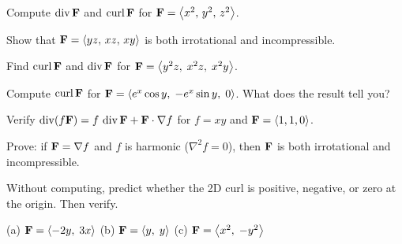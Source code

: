\documentclass[11pt]{article}
\begin{document}
\begin{practice}

\prob
Compute $\operatorname{div}\mathbf{F}$ and $\operatorname{curl}\mathbf{F}$ for $\mathbf{F} = \left\langle x^2,\, y^2,\, z^2 \right\rangle$.


\vspace{1.5cm}

\prob
Show that $\mathbf{F} = \left\langle yz,\, xz,\, xy \right\rangle$ is both irrotational and incompressible.


\vspace{1.5cm}

\prob
Find $\operatorname{curl}\mathbf{F}$ and $\operatorname{div}\mathbf{F}$ for $\mathbf{F} = \left\langle y^2 z,\; x^2 z,\; x^2 y \right\rangle$.


\vspace{2.5cm}

\prob
Compute $\operatorname{curl}\mathbf{F}$ for $\mathbf{F} = \left\langle e^x\cos y,\; -e^x\sin y,\; 0 \right\rangle$. What does the result tell you?


\vspace{2cm}

\prob
Verify $\operatorname{div}(f\mathbf{F}) = f\,\operatorname{div}\mathbf{F} + \mathbf{F}\cdot\nabla f$ for $f = xy$ and $\mathbf{F} = \left\langle 1, 1, 0 \right\rangle$.


\vspace{1.5cm}

\prob
Prove: if $\mathbf{F} = \nabla f$ and $f$ is harmonic ($\nabla^2 f = 0$), then $\mathbf{F}$ is both irrotational and incompressible.


\prob
Without computing, predict whether the 2D curl is positive, negative, or zero at the origin. Then verify.

(a) $\mathbf{F} = \left\langle -2y,\; 3x \right\rangle$ \qquad (b) $\mathbf{F} = \left\langle y,\; y \right\rangle$ \qquad (c) $\mathbf{F} = \left\langle x^2,\; -y^2 \right\rangle$


\end{practice}
\end{document}
